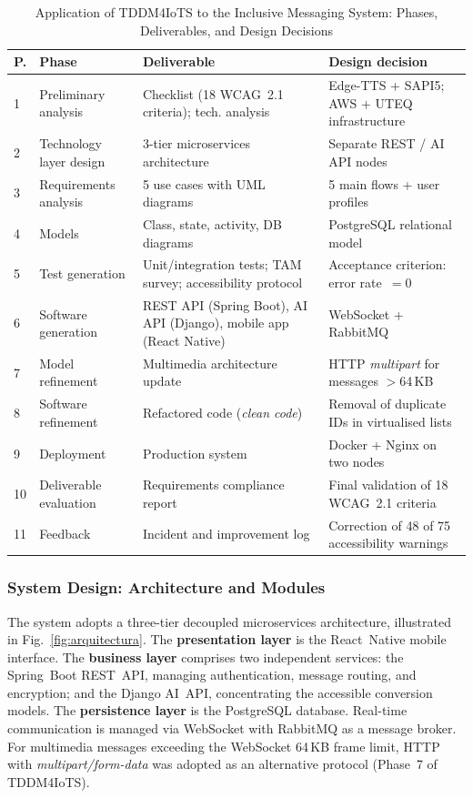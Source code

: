 \documentclass[journal]{IEEEtran}
\begin{document}
	\begin{table}[!t]
		\caption{Application of TDDM4IoTS to the Inclusive Messaging System:
			Phases, Deliverables, and Design Decisions}
		\label{tab:fases_tddm4iots}
		\centering
		\scriptsize
		\renewcommand{\arraystretch}{1.25}
		\begin{tabular}{p{0.25cm}p{1.9cm}p{2.5cm}p{2.1cm}}
			\toprule
			\textbf{P.} & \textbf{Phase} & \textbf{Deliverable} & \textbf{Design decision} \\
			\midrule
			1 & Preliminary analysis & Checklist (18 WCAG~2.1 criteria); tech. analysis & Edge-TTS + SAPI5; AWS + UTEQ infrastructure \\
			2 & Technology layer design & 3-tier microservices architecture & Separate REST / AI API nodes \\
			3 & Requirements analysis & 5 use cases with UML diagrams & 5 main flows + user profiles \\
			4 & Models & Class, state, activity, DB diagrams & PostgreSQL relational model \\
			5 & Test generation & Unit/integration tests; TAM survey; accessibility protocol & Acceptance criterion: error rate~$=0$ \\
			6 & Software generation & REST API (Spring Boot), AI API (Django), mobile app (React Native) & WebSocket + RabbitMQ \\
			7 & Model refinement & Multimedia architecture update & HTTP \textit{multipart} for messages $>$64\,KB \\
			8 & Software refinement & Refactored code (\textit{clean code}) & Removal of duplicate IDs in virtualised lists \\
			9 & Deployment & Production system & Docker + Nginx on two nodes \\
			10 & Deliverable evaluation & Requirements compliance report & Final validation of 18 WCAG~2.1 criteria \\
			11 & Feedback & Incident and improvement log & Correction of 48 of 75 accessibility warnings \\
			\bottomrule
		\end{tabular}
	\end{table}
	
	\subsubsection{System Design: Architecture and Modules}
	The system adopts a three-tier decoupled microservices architecture,
	illustrated in Fig.~\ref{fig:arquitectura}.
	The \textbf{presentation layer} is the React~Native mobile
	interface.
	The \textbf{business layer} comprises two independent services:
	the Spring~Boot REST~API, managing authentication,
	message routing, and encryption; and the Django AI~API,
	concentrating the accessible conversion models.
	The \textbf{persistence layer} is the PostgreSQL database.
	Real-time communication is managed via WebSocket with RabbitMQ
	as a message broker.
	For multimedia messages exceeding the WebSocket 64\,KB frame
	limit, HTTP with \textit{multipart/form-data} was adopted as
	an alternative protocol (Phase~7 of TDDM4IoTS).
	
\end{document}
